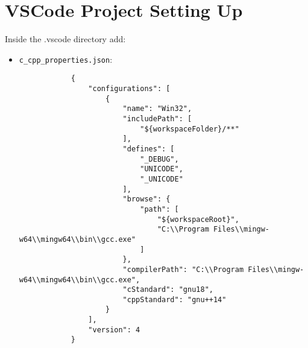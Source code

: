 \section{VSCode Project Setting Up}
Inside the .vscode directory add: 
\begin{itemize}
    \item \verb|c_cpp_properties.json|:
        \begin{verbatim}
            {
                "configurations": [
                    {
                        "name": "Win32",
                        "includePath": [
                            "${workspaceFolder}/**"
                        ],
                        "defines": [
                            "_DEBUG",
                            "UNICODE",
                            "_UNICODE"
                        ], 
                        "browse": {
                            "path": [
                                "${workspaceRoot}",
                                "C:\\Program Files\\mingw-w64\\mingw64\\bin\\gcc.exe"
                            ]  
                        },
                        "compilerPath": "C:\\Program Files\\mingw-w64\\mingw64\\bin\\gcc.exe",
                        "cStandard": "gnu18",
                        "cppStandard": "gnu++14"
                    }
                ],
                "version": 4
            }
        \end{verbatim}
    

\end{itemize}
